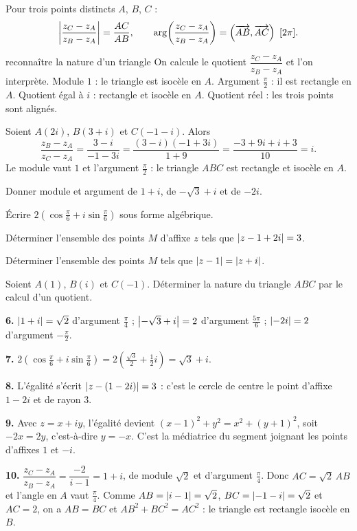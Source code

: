 \begin{propriete}
Pour trois points distincts $A$, $B$, $C$ :
\[
  \left|\frac{z_{C}-z_{A}}{z_{B}-z_{A}}\right| = \frac{AC}{AB},
  \qquad
  \arg\!\left(\frac{z_{C}-z_{A}}{z_{B}-z_{A}}\right)
  = \left(\overrightarrow{AB},\overrightarrow{AC}\right) \ [2\pi].
\]
\end{propriete}

\begin{methode}{reconnaître la nature d'un triangle}
On calcule le quotient $\dfrac{z_{C}-z_{A}}{z_{B}-z_{A}}$ et l'on interprète.
Module $1$ : le triangle est isocèle en $A$. Argument $\frac{\pi}{2}$ : il est
rectangle en $A$. Quotient égal à $i$ : rectangle et isocèle en $A$. Quotient
réel : les trois points sont alignés.
\end{methode}

\begin{exemple}
Soient $A(2i)$, $B(3+i)$ et $C(-1-i)$. Alors
\[
  \frac{z_{B}-z_{A}}{z_{C}-z_{A}} = \frac{3-i}{-1-3i}
  = \frac{(3-i)(-1+3i)}{1+9} = \frac{-3+9i+i+3}{10} = i .
\]
Le module vaut $1$ et l'argument $\frac{\pi}{2}$ : le triangle $ABC$ est
rectangle et isocèle en $A$.
\end{exemple}

\begin{entrainement}
\exo[\niveau{1}] Donner module et argument de $1+i$, de $-\sqrt3+i$ et de
$-2i$.

\exo[\niveau{1}] Écrire $2\left(\cos\frac{\pi}{6}+i\sin\frac{\pi}{6}\right)$
sous forme algébrique.

\exo[\niveau{2}] Déterminer l'ensemble des points $M$ d'affixe $z$ tels que
$\left|z-1+2i\right| = 3$.

\exo[\niveau{2}] Déterminer l'ensemble des points $M$ tels que
$\left|z-1\right| = \left|z+i\right|$.

\exo[\niveau{3}] Soient $A(1)$, $B(i)$ et $C(-1)$. Déterminer la nature du
triangle $ABC$ par le calcul d'un quotient.
\end{entrainement}

\begin{corrige}
\textbf{6.} $\left|1+i\right| = \sqrt2$ d'argument $\frac{\pi}{4}$ ;
$\left|-\sqrt3+i\right| = 2$ d'argument $\frac{5\pi}{6}$ ; $\left|-2i\right| = 2$
d'argument $-\frac{\pi}{2}$.

\textbf{7.} $2\left(\cos\frac{\pi}{6}+i\sin\frac{\pi}{6}\right)
= 2\left(\frac{\sqrt3}{2}+\frac12 i\right) = \sqrt3+i$.

\textbf{8.} L'égalité s'écrit $\left|z-(1-2i)\right| = 3$ : c'est le cercle de
centre le point d'affixe $1-2i$ et de rayon $3$.

\textbf{9.} Avec $z = x+iy$, l'égalité devient
$(x-1)^{2}+y^{2} = x^{2}+(y+1)^{2}$, soit $-2x = 2y$, c'est-à-dire $y = -x$.
C'est la médiatrice du segment joignant les points d'affixes $1$ et $-i$.

\textbf{10.} $\dfrac{z_{C}-z_{A}}{z_{B}-z_{A}} = \dfrac{-2}{i-1} = 1+i$, de
module $\sqrt2$ et d'argument $\frac{\pi}{4}$. Donc $AC = \sqrt2\,AB$ et
l'angle en $A$ vaut $\frac{\pi}{4}$. Comme $AB = \left|i-1\right| = \sqrt2$,
$BC = \left|-1-i\right| = \sqrt2$ et $AC = 2$, on a $AB = BC$ et
$AB^{2}+BC^{2} = AC^{2}$ : le triangle est rectangle isocèle en $B$.
\end{corrige}

